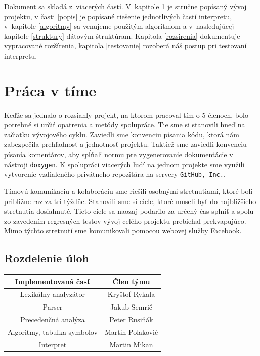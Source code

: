 \documentclass[11pt,a4paper]{article}
\begin{document}
Dokument sa skladá z~viacerých častí. V~kapitole \ref{tim} je stručne popísaný vývoj projektu, v časti \ref{popis} je popísané riešenie jednotlivých častí interpretu, v~kapitole \ref{algoritmy} sa venujeme použitým algoritmom a v~nasledujúcej kapitole \ref{struktury} dátovým štruktúram. Kapitola \ref{rozsirenia} dokumentuje vypracované rozšírenia, kapitola \ref{testovanie} rozoberá náš postup pri testovaní interpretu.


\section{Práca v tíme} 
\label{tim}

Keďže sa jednalo o rozsiahly projekt, na ktorom pracoval tím o 5 členoch, bolo potrebné si určiť opatrenia a metódy spolupráce. Tie sme si stanovili hneď na začiatku vývojového cyklu. Zaviedli sme konvenciu písania kódu, ktorá nám zabezpečila prehľadnosť a jednotnosť projektu. Taktiež sme zaviedli konvenciu písania komentárov, aby spĺňali normu pre vygenerovanie dokumentácie v nástroji \texttt{doxygen}. K spolupráci viacerých ľudí na jednom projekte sme využili vytvorenie vzdialeného privátneho repozitára na servery \texttt{GitHub, Inc.}.

Tímovú komuníkaciu a kolaboráciu sme riešili osobnými stretnutiami, ktoré boli približne raz za tri týždňe. Stanovili sme si ciele, ktoré museli byť do najbližšieho stretnutia dosiahnuté. Tieto ciele sa naozaj podarilo za určený čas splniť a spolu zo zavedením regresných testov vývoj celého projektu prebiehal prekvapujúco. Mimo týchto stretnutí sme komunikovali pomocou webovej služby Facebook.

    \subsection{Rozdelenie úloh}
    \begin{center}
    \begin{tabular}{|c|c|}
    \hline
    \large{\textbf{Implementovaná časť}} & \large{\textbf{Člen týmu}}\\
    \hline
    \hline
    Lexikálny analyzátor & Kryštof Rykala \\
    \hline
    Parser & Jakub Semrič \\
    \hline
    Precedenčná analýza & Peter Rusiňák \\
    \hline
    Algoritmy, tabuľka symbolov & Martin Polakovič \\
    \hline
    Interpret & Martin Mikan \\
    \hline
    \end{tabular}
\end{center}
    
\end{document}
